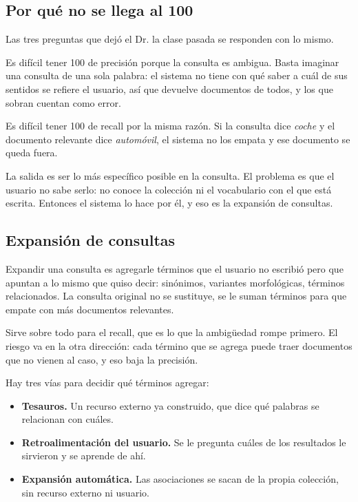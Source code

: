 \documentclass[11pt,letterpaper]{article}
\begin{document}
\subsection*{Por qué no se llega al 100}

Las tres preguntas que dejó el Dr. la clase pasada se responden con lo
mismo.

Es difícil tener 100 de precisión porque la consulta es ambigua. Basta
imaginar una consulta de una sola palabra: el sistema no tiene con qué
saber a cuál de sus sentidos se refiere el usuario, así que devuelve
documentos de todos, y los que sobran cuentan como error.

Es difícil tener 100 de recall por la misma razón. Si la consulta dice
\emph{coche} y el documento relevante dice \emph{automóvil}, el sistema
no los empata y ese documento se queda fuera.

\begin{idea}
    La salida es ser lo más específico posible en la consulta. El
    problema es que el usuario no sabe serlo: no conoce la colección ni
    el vocabulario con el que está escrita. Entonces el sistema lo hace
    por él, y eso es la expansión de consultas.
\end{idea}

\subsection*{Expansión de consultas}

Expandir una consulta es agregarle términos que el usuario no escribió
pero que apuntan a lo mismo que quiso decir: sinónimos, variantes
morfológicas, términos relacionados. La consulta original no se
sustituye, se le suman términos para que empate con más documentos
relevantes.

Sirve sobre todo para el recall, que es lo que la ambigüedad rompe
primero. El riesgo va en la otra dirección: cada término que se agrega
puede traer documentos que no vienen al caso, y eso baja la precisión.

Hay tres vías para decidir qué términos agregar:

\begin{itemize}[itemsep=0.2em]
    \item \textbf{Tesauros.} Un recurso externo ya construido, que dice
          qué palabras se relacionan con cuáles.
    \item \textbf{Retroalimentación del usuario.} Se le pregunta cuáles
          de los resultados le sirvieron y se aprende de ahí.
    \item \textbf{Expansión automática.} Las asociaciones se sacan de
          la propia colección, sin recurso externo ni usuario.
\end{itemize}
\end{document}
